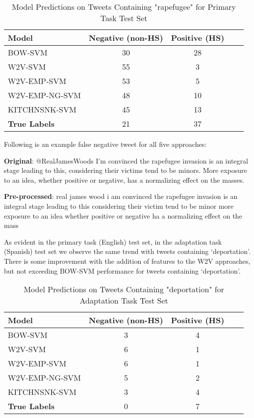 \documentclass[11pt,a4paper]{article}
\begin{document}
\begin{table}[h]
\centering
\caption{Model Predictions on Tweets Containing "rapefugee" for Primary Task Test Set}
\label{tab:model_predictions}
\scriptsize
\begin{tabular}{lcccc}
\hline
Model & Negative (non-HS) & Positive (HS) \\ \hline
\textsc{BOW-SVM} & 30 & 28 \\
\textsc{W2V-SVM} & 55 & 3 \\
\textsc{W2V-EMP-SVM} & 53 & 5 \\
\textsc{W2V-EMP-NG-SVM} & 48 & 10 \\
\textsc{KITCHNSNK-SVM} & 45 & 13 \\
\textbf{True Labels} & 21 & 37\\ \hline
\end{tabular}
\end{table}


Following is an example false negative tweet for all five approaches:
\begin{displayquote}
    \textbf{Original}: @RealJamesWoods I'm convinced the rapefugee invasion is an integral stage leading to this, considering their victims tend to be minors. More exposure to an idea, whether positive or negative, has a normalizing effect on the masses.
\end{displayquote}

\begin{displayquote}
    \textbf{Pre-processed}: real james wood i am convinced the rapefugee invasion is an integral stage leading to this considering their victim tend to be minor more exposure to an idea whether positive or negative ha a normalizing effect on the mass
\end{displayquote}

As evident in the primary task (English) test set, in the adaptation task (Spanish) test set we observe the same trend with tweets containing ‘deportation’. There is some improvement with the addition of features to the W2V approaches, but not exceeding BOW-SVM performance for tweets containing ‘deportation’.



\begin{table}[h]
\centering
\caption{Model Predictions on Tweets Containing "deportation" for Adaptation Task Test Set}
\label{tab:model_predictions}
\scriptsize
\begin{tabular}{lcccc}
\hline
Model & Negative (non-HS) & Positive (HS) \\ \hline
\textsc{BOW-SVM} & 3 & 4 \\
\textsc{W2V-SVM} & 6 & 1 \\
\textsc{W2V-EMP-SVM} & 6 & 1 \\
\textsc{W2V-EMP-NG-SVM} & 5 & 2 \\
\textsc{KITCHNSNK-SVM} & 3 & 4 \\
\textbf{True Labels} & 0 & 7\\ \hline
\end{tabular}
\end{table}
\end{document}
